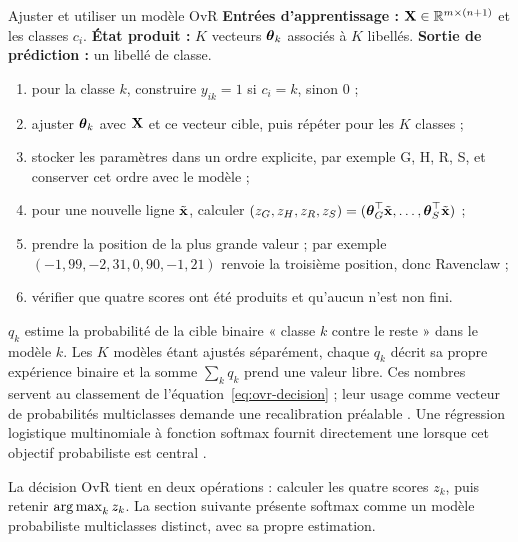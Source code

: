 \begin{procedure}{Ajuster et utiliser un modèle OvR}
\textbf{Entrées d'apprentissage :} $\mathbf{X}\in\mathbb{R}^{m\times(n+1)}$ et les classes
$c_i$. \textbf{État produit :} $K$ vecteurs $\boldsymbol{\theta}_k$ associés à $K$ libellés.
\textbf{Sortie de prédiction :} un libellé de classe.
\begin{enumerate}
  \item pour la classe $k$, construire $y_{ik}=1$ si $c_i=k$, sinon $0$ ;
  \item ajuster $\boldsymbol{\theta}_k$ avec $\mathbf{X}$ et ce vecteur cible, puis répéter pour les $K$ classes ;
  \item stocker les paramètres dans un ordre explicite, par exemple
        G, H, R, S, et conserver cet ordre avec le modèle ;
  \item pour une nouvelle ligne $\tilde{\mathbf{x}}$, calculer
        $(z_G,z_H,z_R,z_S)=(\boldsymbol{\theta}_G^\top\tilde{\mathbf{x}},\ldots,\boldsymbol{\theta}_S^\top\tilde{\mathbf{x}})$ ;
  \item prendre la position de la plus grande valeur ; par exemple
        $(-1{,}99,-2{,}31,0{,}90,-1{,}21)$ renvoie la troisième position, donc Ravenclaw ;
  \item vérifier que quatre scores ont été produits et qu'aucun n'est non fini.
\end{enumerate}
\end{procedure}

\begin{vigilance}
$q_k$ estime la probabilité de la cible binaire « classe $k$ contre le reste »
dans le modèle $k$. Les $K$ modèles étant ajustés séparément, chaque $q_k$ décrit
sa propre expérience binaire et la somme $\sum_k q_k$ prend une valeur libre. Ces
nombres servent au classement de l'équation~\eqref{eq:ovr-decision} ; leur usage
comme vecteur de probabilités multiclasses  demande une recalibration
préalable \cite{zadrozny2002}. Une régression logistique multinomiale à fonction
softmax fournit directement une  lorsque cet objectif
probabiliste est central \cite{hastie2009}.
\end{vigilance}

\begin{resultat}
La décision OvR tient en deux opérations : calculer les quatre scores $z_k$, puis
retenir $\operatorname*{arg\,max}_k z_k$. La section suivante présente softmax comme un modèle
probabiliste multiclasses distinct, avec sa propre estimation.
\end{resultat}

